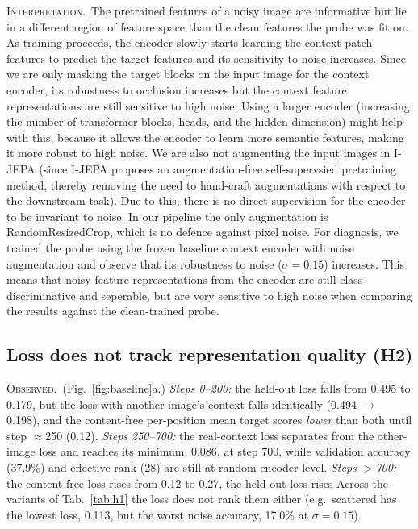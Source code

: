 \documentclass[10pt]{article}
\newcommand{\obs}{\textsc{Observed.}~}
\newcommand{\interp}{\textsc{Interpretation.}~}
\begin{document}
\interp The pretrained features of a noisy image are informative but lie in a different region of feature space than
the clean features the probe was fit on. 
As training proceeds, the encoder slowly starts learning the context patch features to predict the target features and 
its sensitivity to noise increases. Since we are only masking the target blocks on the input image for the context encoder,
its robustness to occlusion increases but the context feature representations are still sensitive to high noise. 
Using a larger encoder (increasing the number of transformer blocks, heads, and the hidden dimension) might help with this,
because it allows the encoder to learn more semantic features, making it more robust to high noise. 
We are also not augmenting the input images in I-JEPA (since I-JEPA proposes an augmentation-free self-supervsied pretraining method,
thereby removing the need to hand-craft augmentations with respect to the downstream task). Due to this, there is no direct supervision
for the encoder to be invariant to noise. In our pipeline the only
augmentation is RandomResizedCrop, which is no defence against pixel noise. For diagnosis, we trained the probe using the frozen baseline
context encoder with noise augmentation and observe that its robustness to noise ($\sigma{=}0.15$) increases. This means that 
noisy feature representations from the encoder are still class-discriminative and seperable, but are very sensitive to high noise when 
comparing the results against the clean-trained probe.


\subsection{Loss does not track representation quality (H2)}
\label{sec:h2}
\obs (Fig.~\ref{fig:baseline}a.) \emph{Steps 0--200:} the held-out loss falls from 0.495 to 0.179, but the loss with
another image's context falls identically (0.494 $\to$ 0.198), and the content-free per-position mean target scores
\emph{lower} than both until step $\approx$250 (0.12). \emph{Steps 250--700:} the real-context loss separates from the
other-image loss and reaches its minimum, 0.086, at step 700, while validation accuracy (37.9\%) and effective rank (28) are
still at random-encoder level. \emph{Steps $>$700:} the content-free loss rises from 0.12 to 0.27, the held-out loss rises
Across the variants of Tab.~\ref{tab:h1} the loss does not rank them
either (e.g.\ scattered has the lowest loss, 0.113, but the worst noise accuracy, 17.0\% at $\sigma{=}0.15$).
\end{document}
